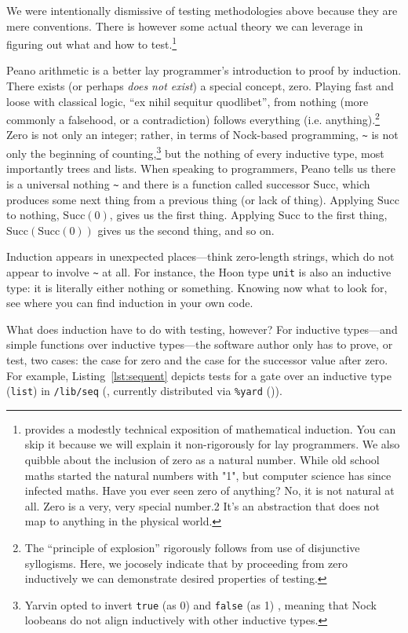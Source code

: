 \documentclass[twoside]{article}
\begin{document}
We were intentionally dismissive of testing methodologies above because they are mere conventions. There is however some actual theory we can leverage in figuring out what and how to test.\footnote{\citet{WikipediaInduction} provides a modestly technical exposition of mathematical induction. You can skip it because we will explain it non-rigorously for lay programmers. We also quibble about the inclusion of zero as a natural number. While old school maths started the natural numbers with "1", but computer science has since infected maths. Have you ever seen zero of anything? No, it is not natural at all. Zero is a very, very special number.2 It's an abstraction that does not map to anything in the physical world.}

Peano arithmetic is a better lay programmer's introduction to proof by induction. There exists (or perhaps \emph{does not exist}) a special concept, zero. Playing fast and loose with classical logic, “ex nihil sequitur quodlibet”, from nothing (more commonly a falsehood, or a contradiction) follows everything (i.e. anything).\footnote{The “principle of explosion” rigorously follows from use of disjunctive syllogisms.  Here, we jocosely indicate that by proceeding from zero inductively we can demonstrate desired properties of testing.} Zero is not only an integer; rather, in terms of Nock-based programming, \lstinline[style=inlinecode]{~} is not only the beginning of counting,\footnote{Yarvin opted to invert \texttt{true} (as 0) and \texttt{false} (as 1) \citep{Yarvin2006}, meaning that Nock loobeans do not align inductively with other inductive types.} but the nothing of every inductive type, most importantly trees and lists. When speaking to programmers, Peano tells us there is a universal nothing \lstinline[style=inlinecode]{~} and there is a function called successor $\textrm{Succ}$, which produces some next thing from a previous thing (or lack of thing). Applying $\textrm{Succ}$ to nothing, $\textrm{Succ}(0)$, gives us the first thing.  Applying $\textrm{Succ}$ to the first thing, $\textrm{Succ}(\textrm{Succ}(0))$ gives us the second thing, and so on.

Induction appears in unexpected places—think zero-length strings, which do not appear to involve \lstinline[style=inlinecode]{~} at all. For instance, the Hoon type \texttt{unit} is also an inductive type: it is literally either nothing or something. Knowing now what to look for, see where you can find induction in your own code.

What does induction have to do with testing, however?  For inductive types—and simple functions over inductive types—the software author only has to prove, or test, two cases:  the case for zero and the case for the successor value after zero.  For example, Listing~\ref{lst:sequent} depicts tests for a gate over an inductive type (\texttt{list}) in \texttt{/lib/seq} (, currently distributed via \texttt{\%yard} ()).
\end{document}
